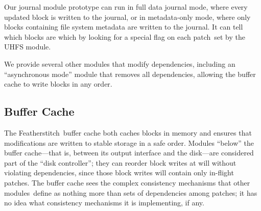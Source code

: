 \documentclass[9pt,twocolumn,letterpaper]{article}
\newcommand{\Kudos}{Featherstitch}
\newcommand{\patch}{patch}
\newcommand{\patches}{patches}
\newcommand{\module}{module}
\newcommand{\modules}{modules}
\begin{document}


Our journal module prototype can run in full data journal mode, where every
updated block is written to the journal, or in metadata-only mode, where only
blocks containing file system metadata are written to the journal. It can
tell which blocks are which by looking for a special flag on each \patch\ set
by the UHFS module.

We provide several other modules that modify dependencies, including an
``asynchronous mode'' module that removes all dependencies, allowing the
buffer cache to write blocks in any order.
%


\subsection{Buffer Cache}
\label{sec:modules:wbcache}

The \Kudos\ buffer cache both
%
caches blocks in memory and
ensures that modifications are written to stable storage in a safe order.
%
Modules ``below'' the buffer cache---that is, between its output interface
and the disk---are considered part of the ``disk controller''; they can
reorder block writes at will without violating dependencies, since those block
writes will contain only in-flight patches.
%
%
The buffer cache sees the complex
consistency mechanisms that other \modules\ define as nothing more
than sets of dependencies among \patches; it has no idea what consistency
mechanisms it is implementing, if any.
\end{document}
